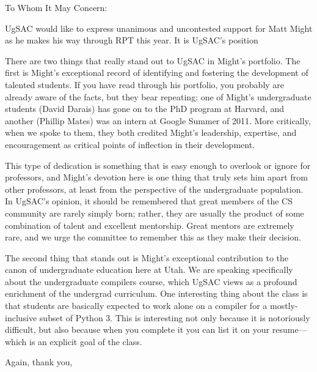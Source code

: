 \documentclass{letter}
\begin{document}
\begin{letter}{}
\opening{To Whom It May Concern:}

UgSAC would like to express unanimous and uncontested support for Matt Might as he makes his way through RPT this year. It is UgSAC's position

There are two things that really stand out to UgSAC in Might's portfolio. The first is Might's exceptional record of identifying and fostering the development of talented students. If you have read through his portfolio, you probably are already aware of the facts, but they bear repeating: one of Might's undergraduate students (David Darais) has gone on to the PhD program at Harvard, and another (Phillip Mates) was an intern at Google Summer of 2011. More critically, when we spoke to them, they both credited Might's leadership, expertise, and encouragement as critical points of inflection in their development.

This type of dedication is something that is easy enough to overlook or ignore for professors, and Might's devotion here is one thing that truly sets him apart from other professors, at least from the perspective of the undergraduate population. In UgSAC's opinion, it should be remembered that great members of the CS community are rarely simply born; rather, they are usually the product of some combination of talent and excellent mentorship. Great mentors are extremely rare, and we urge the committee to remember this as they make their decision.

The second thing that stands out is Might's exceptional contribution to the canon of undergraduate education here at Utah. We are speaking specifically about the undergraduate compilers course, which UgSAC views as a profound enrichment of the undergrad curriculum. One interesting thing about the class is that students are basically expected to work alone on a compiler for a mostly-inclusive subset of Python 3. This is interesting not only because it is notoriously difficult, but also because when you complete it you can list it on your resume---which is an explicit goal of the class.



\closing{Again, thank you,}

\end{letter}
\end{document}
